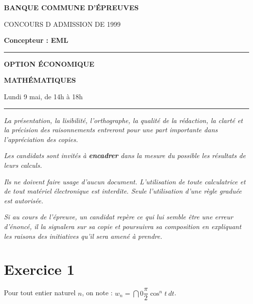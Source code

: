 \documentclass[11pt]{article}%
\begin{document}

\begin{center}
{\LARG\E\textbf{BANQUE COMMUNE D'ÉPREUVES}}



{\large \textsc{CONCOURS D ADMISSION DE 1999}}



{\large \textbf{Concepteur : EML}}



\rule{2.39cm}{0.05cm}



{\Large \textbf{OPTION ÉCONOMIQUE}}



{\Large \textbf{MATHÉMATIQUES }}



{\Large Lundi 9 mai, de 14h à 18h}



\rule{2.39cm}{0.05cm}
\end{center}

\textit{La présentation, la lisibilité, l'orthographe, la qualité
de la rédaction, la clarté et la précision des raisonnements
entreront pour une part importante dans l'appréciation des copies.}

\textit{Les candidats sont invités à \textbf{encadrer} dans la mesure
du possible les résultats de leurs calculs.}

\textit{Ils ne doivent faire usage d'aucun document. L'utilisation de
toute
calculatrice et de tout matériel électronique est interdite. Seule
l'utilisation d'une règle graduée est autorisée.}

\textit{Si au cours de l'épreuve, un candidat repère ce qui lui semble
être une erreur d'énoncé, il la signalera sur sa copie et
poursuivra sa composition en expliquant les raisons des initiatives
qu'il sera
amené à prendre.}

\vspace*{3cm}

\section*{Exercice 1}

\noindent Pour tout entier naturel $n$, on note : $w_{n} =
\dint{0}{\dfrac{\pi }{2}}\cos ^{n}t\ dt$.
\end{document}
